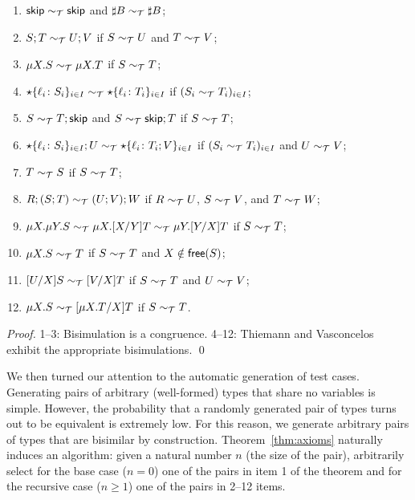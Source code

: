 \begin{theorem}
\label{thm:axioms}
  \begin{enumerate}
  \item $\mathsf{skip} \sim_\mathcal T \mathsf{skip}$ and $\sharp B \sim_\mathcal T \sharp B$;
  \item $S;T \sim_\mathcal T U;V$ if $S \sim_\mathcal T U$ and $T \sim_\mathcal T V$;
  \item $\mu X.S \sim_\mathcal T \mu X.T$ if $S \sim_\mathcal T T$;
  \item $\star\{\ell_i\colon S_i\}_{i\in I}\sim_\mathcal T
    \star\{\ell_i\colon T_i\}_{i\in I}$ if $(S_i \sim_\mathcal T T_i)_{i\in
      I}$;
  \item $S\sim_\mathcal T T;\mathsf{skip}$ and $S\sim_\mathcal T \mathsf{skip};T$ if $S \sim_\mathcal T T$;
  \item $\star\{\ell_i\colon S_i\}_{i\in I};U\sim_\mathcal T
    \star\{\ell_i\colon T_i;V\}_{i\in I}$ if $(S_i \sim_\mathcal T T_i)_{i\in
      I}$ and $U \sim_\mathcal T V$;
  \item $T \sim_\mathcal T S$ if $S \sim_\mathcal T T$;
  \item $R;(S;T) \sim_\mathcal T (U;V);W$ if $R \sim_\mathcal T U$, $S \sim_\mathcal T V$, and $T\sim_\mathcal T W$;
  \item
    $\mu X.\mu Y.S \sim_\mathcal T \mu X.[{X}/{Y}]T \sim_\mathcal T \mu Y.[{Y}/{X}]T$ if $S \sim_\mathcal T T$;
  \item $\mu X.S \sim_\mathcal T T$ if $S \sim_\mathcal T T$ and $X\notin\mathsf{free}(S)$;
  \item $[{U}/{X}]S\sim_\mathcal T [{V}/{X}]T$  if $S \sim_\mathcal T T$ and $U \sim_\mathcal T V$;
  \item $\mu X.S \sim_\mathcal T [{\mu X.T}/{X}]T$ if $S \sim_\mathcal T T$.
  \end{enumerate}
\end{theorem}
%
\begin{proof}
  1--3: Bisimulation is a congruence. 4--12: Thiemann and
  Vasconcelos~\cite{thiemann2016context} exhibit the appropriate
  bisimulations. \qed
\end{proof}

We then turned our attention to the automatic generation of test
cases. Generating pairs of arbitrary (well-formed) types that share no
variables is simple. 
However,
the probability that a randomly generated pair of types
turns out to be equivalent is extremely low. For this reason, we
generate arbitrary pairs of types that are bisimilar by
construction. Theorem~\ref{thm:axioms} naturally induces an algorithm:
given a natural number $n$ (the size of the pair), arbitrarily select
for the base case ($n=0$) one of the pairs in item 1 of the theorem
and for the recursive case ($n\ge1$) one of the pairs in 2--12 items.\\

